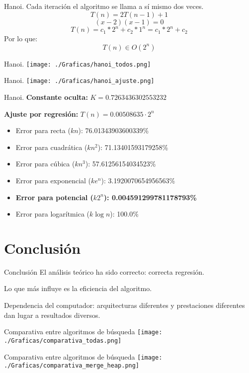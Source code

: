 \documentclass[10pt, xcolor=table]{beamer}
\begin{document}
\begin{frame}[fragile]{Hanoi. 
}
Cada iteración el algoritmo se llama a sí mismo dos veces. $$T(n) = 2T(n-1)+1$$ $$(x-2)(x-1) = 0$$ $$T(n) = c_1*2^n+c_2*1^n = c_1*2^n + c_2$$ Por lo que: $$T(n) \in O(2^n)$$
\end{frame}

\begin{frame}[fragile]{Hanoi. 
}
\texttt{[image: ./Graficas/hanoi\_todos.png]}
\end{frame}

\begin{frame}[fragile]{Hanoi. 
}
\texttt{[image: ./Graficas/hanoi\_ajuste.png]}
\end{frame}

\begin{frame}[fragile]{Hanoi. 
	}
\textbf{Constante oculta:} $K=0.7263436302553232$

\textbf{Ajuste por regresión:} $T(n)=0.00508635\cdot 2^n$
\begin{itemize}
	\item Error para recta ($kn$): 76.01343903600339\%
	\item Error para cuadrática ($kn^2$): 71.13401593179258\%
	\item Error para cúbica ($kn^3$): 57.61256154034523\%
	\item Error para exponencial ($ke^n$): 3.1920070654956563\%
	\item \textbf{Error para potencial ($k2^n$): 0.004591299781178793\%}
	\item Error para logarítmica ($k\log n$): 100.0\%
\end{itemize}
\end{frame}

\section{Conclusión}

\begin{frame}{Conclusión}
El análisis teórico ha sido correcto: correcta regresión.

Lo que más influye es la eficiencia del algoritmo.

Dependencia del computador: arquitecturas diferentes y prestaciones diferentes dan lugar a resultados diversos.
\end{frame}


\begin{frame}{Comparativa entre algoritmos de búsqueda}
\texttt{[image: ./Graficas/comparativa\_todas.png]}
\end{frame}

\begin{frame}{Comparativa entre algoritmos de búsqueda}
\texttt{[image: ./Graficas/comparativa\_merge\_heap.png]}
\end{frame}
\end{document}
